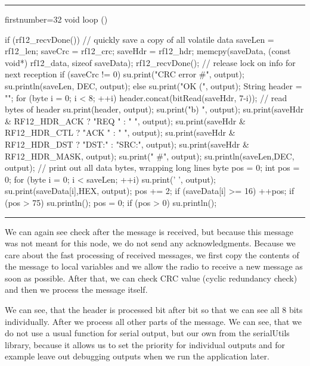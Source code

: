 \documentclass[12pt,titlepage]{article}
\newcommand{\codetitle}[1]{\bigskip \noindent {\scriptsize #1}\hrule}
\begin{document}
        \newpage
        \codetitle{\texttt{loop} function in the Sniffer application}
        \begin{cppcode*}{firstnumber=32}
        void loop () {

            if (rf12_recvDone()) {
                // quickly save a copy of all volatile data saveLen = rf12_len;
                saveCrc = rf12_crc;
                saveHdr = rf12_hdr;
                memcpy(saveData, (const void*) rf12_data, sizeof saveData);
                rf12_recvDone();
                // release lock on info for next reception
                if (saveCrc != 0) {
                    su.print("CRC error #", output);
                    su.println(saveLen, DEC, output);
                }
                else {
                    su.print("OK (", output);
                    String header = "";
                    for (byte i = 0; i < 8; ++i) {
                        header.concat(bitRead(saveHdr, 7-i)); // read bytes of header
                    }
                    su.print(header, output);
                    su.print("b) ", output);
                    su.print(saveHdr & RF12_HDR_ACK ? "REQ " : " ", output);
                    su.print(saveHdr & RF12_HDR_CTL ? "ACK " : " ", output);
                    su.print(saveHdr & RF12_HDR_DST ? "DST:" : "SRC:", output);
                    su.print(saveHdr & RF12_HDR_MASK, output);
                    su.print(" #", output);
                    su.println(saveLen,DEC, output);
                    // print out all data bytes, wrapping long lines byte pos = 0;
                    int pos = 0;
                    for (byte i = 0; i < saveLen; ++i) {
                        su.print(' ', output);
                        su.print(saveData[i],HEX, output);
                        pos += 2;
                        if (saveData[i] >= 16) ++pos;
                        if (pos > 75) {
                            su.println();
                            pos = 0;
                        }
                    }
                    if (pos > 0) su.println();
                }
            }
        }
        \end{cppcode*}
        \hrule
        \bigskip
        We can again see check after the message is received, but because this message was not meant for this node, we do not send any acknowledgments. Because we care about the fast processing of received messages, we first copy the contents of the message to local variables and we allow the radio to receive a new message as soon as possible. After that, we can check CRC value (cyclic redundancy check) and then we process the message itself.

        We can see, that the header is processed bit after bit so that we can see all 8 bits individually. After we process all other parts of the message. We can see, that we do not use a usual function for serial output, but our own from the serialUtils library, because it allows us to set the priority for individual outputs and for example leave out debugging outputs when we run the application later.
\end{document}

